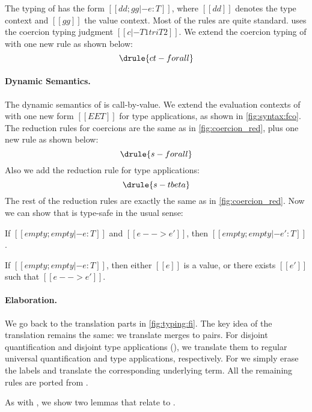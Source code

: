 The typing of \tnamee has the form $[[ dd ; gg |- e : T ]]$, where $[[dd]]$
denotes the type context and $[[gg]]$ the value context. Most of the rules are quite
standard.  uses the coercion typing judgment $[[ c |- T1 tri T2 ]]$. We extend
the coercion typing of \tname with one new rule  as shown below:
\[
  \drule{ct-forall}
\]


\paragraph{\tnamee Dynamic Semantics.}

The dynamic semantics of \tnamee is call-by-value. We extend the evaluation
contexts of \tname with one new form $[[EE T]]$ for type applications, as shown
in \cref{fig:syntax:fco}. The reduction rules for coercions are the same as in
\cref{fig:coercion_red}, plus one new rule  as shown below:
\[
  \drule{s-forall}
\]
Also we add the reduction rule for type applications:
\[
  \drule{s-tbeta}
\]
The rest of the reduction rules are exactly the same as in \cref{fig:coercion_red}. Now we can show
that \tnamee is type-safe in the usual sense:

\begin{theorem}
  If $[[empty; empty |- e : T]]$ and $[[e --> e']]$, then $[[empty; empty |- e' : T]]$.
\end{theorem}

\begin{theorem}
  If $[[empty; empty |- e : T]]$, then either $[[e]]$ is a value, or there exists $[[e']]$ such
  that $[[e --> e']]$.
\end{theorem}


\paragraph{Elaboration.}

We go back to the translation parts in \cref{fig:typing:fi}. The key idea of the
translation remains the same: we translate merges to pairs. For disjoint
quantification and disjoint type applications (), we
translate them to regular universal quantification and type applications,
respectively. For  we simply erase
the labels and translate the corresponding underlying term. All the remaining
rules are ported from \namee.


As with \namee, we show two lemmas that relate \fnamee to \tnamee.

